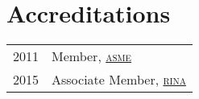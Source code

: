 \section*{Accreditations} %
\label{sec:ce}

\begin{tabular}{l l}
  2011 & Member, \href{https://www.asme.org}{\textsc{asme}} \\
  2015 & Associate Member, \href{https://rina.org.uk}{\textsc{rina}} \\
\end{tabular}

